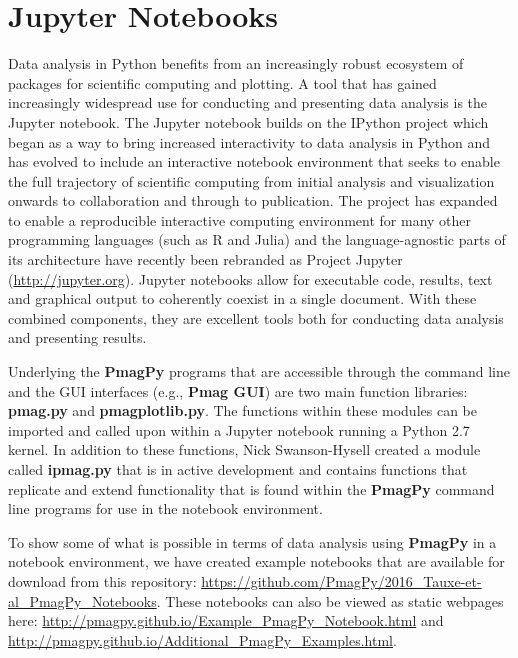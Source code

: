 \documentclass[11pt]{book}
\begin{document}
{{{{

\chapter{Jupyter Notebooks}

Data analysis in Python benefits from an increasingly robust ecosystem of packages for scientific computing and plotting. A tool that has gained increasingly widespread use for conducting and presenting data analysis is the Jupyter notebook. The Jupyter notebook builds on the IPython project which began as a way to bring increased interactivity to data analysis in Python \citep{perez07} and has evolved to include an interactive notebook environment that seeks to enable the full trajectory of scientific computing from initial analysis and visualization onwards to collaboration and through to publication. The project has expanded to enable a reproducible interactive computing environment for many other programming languages (such as R and Julia) and the language-agnostic parts of its architecture have recently been rebranded as Project Jupyter (\url{http://jupyter.org}). Jupyter notebooks allow for executable code, results, text and graphical output to coherently coexist in a single document. With these combined components, they are excellent tools both for conducting data analysis and presenting results.

Underlying the {\bf PmagPy}  programs that are accessible through the command line and the GUI interfaces (e.g., {\bf Pmag GUI}) are two main function libraries: {\bf pmag.py} and {\bf pmagplotlib.py}. The functions within these modules can  be imported and called upon within a Jupyter notebook running a Python 2.7 kernel. In addition to these functions, Nick Swanson-Hysell created a module called {\bf ipmag.py} that is in active development and contains functions that replicate and extend functionality that is found within the {\bf PmagPy}  command line programs for use in the notebook environment.

To show some of what is possible in terms of data analysis using {\bf PmagPy} in a notebook environment, we have created example notebooks that are available for download from this repository: \url{https://github.com/PmagPy/2016_Tauxe-et-al_PmagPy_Notebooks}. These notebooks can also be viewed as static webpages here: \url{http://pmagpy.github.io/Example_PmagPy_Notebook.html} and \url{http://pmagpy.github.io/Additional_PmagPy_Examples.html}.

}}}}
\end{document}
